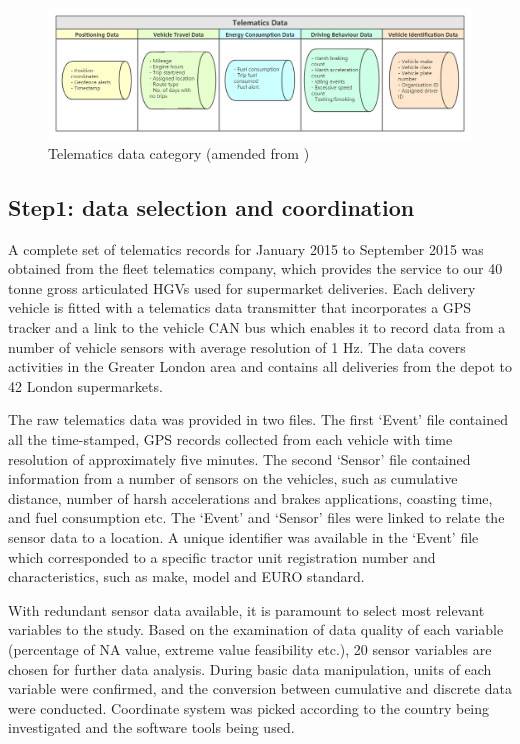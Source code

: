 \documentclass[preprint,12pt,3p]{elsarticle}
\begin{document}
\begin{figure}[H] %
\centering
\includegraphics[width=\linewidth]{telematics category.png} %
\caption{Telematics data category (amended from \cite{RN160})} %
\label{fig1} %
\end{figure}



\subsection{Step1: data selection and coordination}
\label{blockchain}

A complete set of telematics records for January 2015 to September 2015 was obtained from the fleet telematics company, which provides the service to our 40 tonne gross articulated HGVs used for supermarket deliveries. Each delivery vehicle is fitted with a telematics data transmitter that incorporates a GPS tracker and a link to the vehicle CAN bus which enables it to record data from a number of vehicle sensors with average resolution of 1 Hz. The data covers activities in the Greater London area and contains all deliveries from the depot to 42 London supermarkets. 

The raw telematics data was provided in two files. The first ‘Event’ file contained all the time-stamped, GPS records collected from each vehicle with time resolution of approximately five minutes. The second ‘Sensor’ file contained information from a number of sensors on the vehicles, such as cumulative distance, number of harsh accelerations and brakes applications, coasting time, and fuel consumption etc. The ‘Event’ and ‘Sensor’ files were linked to relate the sensor data to a location.  A unique identifier was available in the ‘Event’ file which corresponded to a specific tractor unit registration number and characteristics, such as make, model and EURO standard. 

With redundant sensor data available, it is paramount to select most relevant variables to the study. Based on the examination of data quality of each variable (percentage of NA value, extreme value feasibility etc.), 20 sensor variables are chosen for further data analysis. During basic data manipulation, units of each variable were confirmed, and the conversion between cumulative and discrete data were conducted. Coordinate system was picked according to the country being investigated and the software tools being used.
\end{document}
